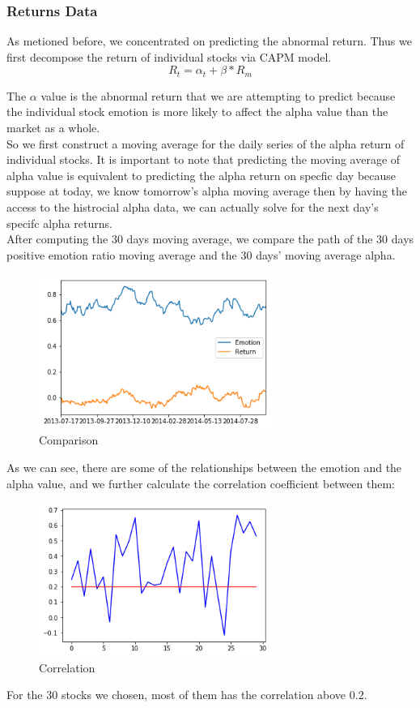 \documentclass[preprint,12pt]{elsarticle}
\begin{document}
\subsubsection{Returns Data}
	As metioned before, we concentrated on predicting the abnormal return. Thus we first decompose the return of individual stocks via CAPM model.
    $$R_t=\alpha_t+\beta*R_m$$
    
    The $\alpha$ value is the abnormal return that we are attempting to predict because the individual stock emotion is more likely to affect the alpha value than the market as a whole.\\
    So we first construct a moving average for the daily series of the alpha return of individual stocks. It is important to note that predicting the moving average of alpha value is equivalent to predicting the alpha return on specfic day because suppose at today, we know tomorrow's alpha moving average then by having the access to the histrocial alpha data, we can actually solve for the next day's specifc alpha returns.\\
    After computing the 30 days moving average, we compare the path of the 30 days positive emotion ratio moving average and the 30 days' moving average alpha.\\
    \begin{figure}[H]
	\centering
\includegraphics[width=3in]{1.png}
	\caption{Comparison}
\end{figure}
    
    As we can see, there are some of the relationships between the emotion and the alpha value, and we further calculate the correlation coefficient between them:\\
 \begin{figure}[H]
	\centering
\includegraphics[width=3in]{2.png}
	\caption{Correlation}
\end{figure}
    For the 30 stocks we chosen, most of them has the correlation above 0.2.\\
\end{document}

